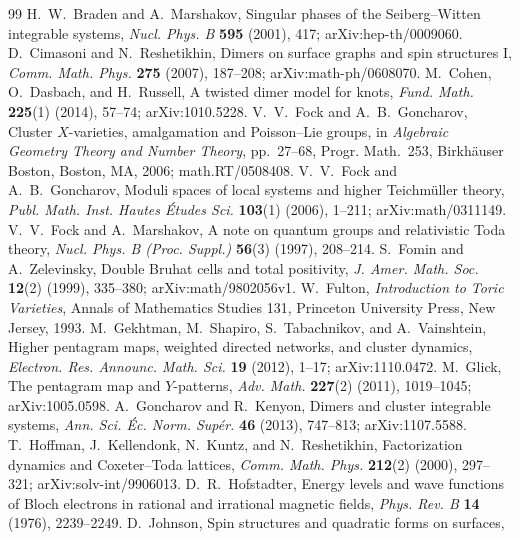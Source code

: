 \renewcommand{\bibname}{第 1 章参考文献}

\begin{thebibliography}{99}\setlength{\itemsep}{0.25em}
 H.~W.~Braden and A.~Marshakov, Singular phases of the Seiberg--Witten
integrable systems, \emph{Nucl. Phys. B} \textbf{595} (2001), 417; arXiv:hep-th/0009060.
 D.~Cimasoni and N.~Reshetikhin, Dimers on surface graphs and spin
structures I, \emph{Comm. Math. Phys.} \textbf{275} (2007), 187--208; arXiv:math-ph/0608070.
 M.~Cohen, O.~Dasbach, and H.~Russell, A twisted dimer model for knots,
\emph{Fund. Math.} \textbf{225}(1) (2014), 57--74; arXiv:1010.5228.
 V.~V.~Fock and A.~B.~Goncharov, Cluster $X$-varieties,
amalgamation and Poisson--Lie groups, in \emph{Algebraic Geometry Theory and Number
Theory}, pp.~27--68, Progr. Math.~253, Birkhäuser Boston, Boston, MA, 2006;
math.RT/0508408.
 V.~V.~Fock and A.~B.~Goncharov, Moduli spaces of local systems
and higher Teichmüller theory, \emph{Publ. Math. Inst. Hautes Études Sci.} \textbf{103}(1)
(2006), 1--211; arXiv:math/0311149.
 V.~V.~Fock and A.~Marshakov, A note on quantum groups and
relativistic Toda theory, \emph{Nucl. Phys. B (Proc. Suppl.)} \textbf{56}(3) (1997),
208--214.
 S.~Fomin and A.~Zelevinsky, Double Bruhat cells and total positivity,
\emph{J. Amer. Math. Soc.} \textbf{12}(2) (1999), 335--380; arXiv:math/9802056v1.
 W.~Fulton, \emph{Introduction to Toric Varieties}, Annals of Mathematics
Studies 131, Princeton University Press, New Jersey, 1993.
 M.~Gekhtman, M.~Shapiro, S.~Tabachnikov, and A.~Vainshtein, Higher
pentagram maps, weighted directed networks, and cluster dynamics, \emph{Electron. Res.
Announc. Math. Sci.} \textbf{19} (2012), 1--17; arXiv:1110.0472.
 M.~Glick, The pentagram map and $Y$-patterns, \emph{Adv. Math.}
\textbf{227}(2) (2011), 1019--1045; arXiv:1005.0598.
 A.~Goncharov and R.~Kenyon, Dimers and cluster integrable
systems, \emph{Ann. Sci. Éc. Norm. Supér.} \textbf{46} (2013), 747--813;
arXiv:1107.5588.
 T.~Hoffman, J.~Kellendonk, N.~Kuntz, and N.~Reshetikhin, Factorization
dynamics and Coxeter--Toda lattices, \emph{Comm. Math. Phys.} \textbf{212}(2) (2000),
297--321; arXiv:solv-int/9906013.
 D.~R.~Hofstadter, Energy levels and wave functions of Bloch electrons
in rational and irrational magnetic fields, \emph{Phys. Rev. B} \textbf{14} (1976),
2239--2249.
 D.~Johnson, Spin structures and quadratic forms on surfaces,

\end{thebibliography}

